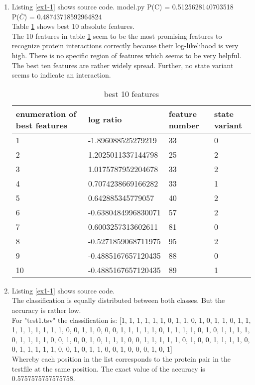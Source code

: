 \documentclass[10pt,a4paper]{article}
\begin{document}
\begin{enumerate}
\item Listing \ref{ex1-1} shows source code.
 {model.py}
P(C) = 0.5125628140703518\\
P($\bar{C}$) = 0.48743718592964824\\
Table \ref{tab1} shows best 10 absolute features.\\
The 10 features in table \ref{tab1} seem to be the most promising features to recognize protein interactions correctly because their log-likelihood is very high. There is no specific region of features which seems to be very helpful. The best ten features are rather widely spread. Further, no state variant seems to indicate an interaction.
\begin{table}[b]
\label{tab1}
\begin{tabular}{llll}
enumeration of best features & log ratio & feature number & state variant\\
\hline
1 & -1.896088525279219 & 33 & 0\\
2 & 1.2025011337144798 & 25 & 2\\
3 & 1.0175787952204678 & 33 & 2\\
4 & 0.7074238669166282 & 33 & 1\\
5 & 0.642885345779057 & 40 & 2\\
6 & -0.6380484996830071 & 57 & 2\\
7 & 0.6003257313602611 & 81 & 0\\
8 & -0.5271859068711975 & 95 & 2\\
9 & -0.4885167657120435 & 88 & 0\\
10 & -0.4885167657120435 & 89 & 1\\
\end{tabular}
\caption{best 10 features}
\end{table}

\item Listing \ref{ex1-1} shows source code.\\
The classification is equally distributed between both classes. But the accuracy is rather low.\\
For "test1.tsv" the classification is: [1, 1, 1, 1, 1, 1, 0, 1, 1, 0, 1, 0, 1, 1, 0, 1, 1, 1, 1, 1, 1, 1, 1, 1, 0, 0, 1, 1, 0, 0, 0, 1, 1, 1, 1, 1, 0, 1, 1, 1, 1, 0, 1, 0, 1, 1, 1, 1, 0, 1, 1, 1, 1, 0, 0, 1, 0, 0, 1, 0, 1, 1, 1, 0, 0, 1, 1, 1, 1, 1, 0, 1, 0, 0, 1, 1, 1, 1, 0, 0, 1, 1, 1, 1, 1, 0, 0, 1, 0, 1, 1, 0, 0, 1, 0, 0, 0, 1, 0, 1]\\
Whereby each position in the list corresponds to the protein pair in the testfile at the same position. The exact value of the accuracy is 0.5757575757575758.


\end{enumerate}
\end{document}
